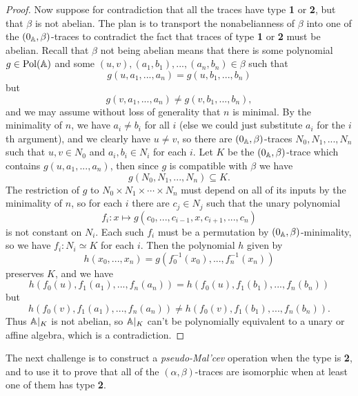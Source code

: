 \begin{appendices}
\begin{proof}
Now suppose for contradiction that all the traces have type \textbf{1} or \textbf{2}, but that $\beta$ is not abelian. The plan is to transport the nonabelianness of $\beta$ into one of the $(0_{\mathbb{A}},\beta)$-traces to contradict the fact that traces of type \textbf{1} or \textbf{2} must be abelian. Recall that $\beta$ not being abelian means that there is some polynomial $g \in \operatorname{Pol}(\mathbb{A})$ and some $(u,v), (a_1,b_1), ..., (a_n,b_n) \in \beta$ such that
\[
g(u,a_1,...,a_n) = g(u,b_1,...,b_n)
\]
but
\[
g(v,a_1,...,a_n) \ne g(v,b_1,...,b_n),
\]
and we may assume without loss of generality that $n$ is minimal. By the minimality of $n$, we have $a_i \ne b_i$ for all $i$ (else we could just substitute $a_i$ for the $i$th argument), and we clearly have $u \ne v$, so there are $(0_{\mathbb{A}},\beta)$-traces $N_0, N_1, ..., N_n$ such that $u,v \in N_0$ and $a_i,b_i \in N_i$ for each $i$. Let $K$ be the $(0_{\mathbb{A}},\beta)$-trace which contains $g(u,a_1,...,a_n)$, then since $g$ is compatible with $\beta$ we have
\[
g(N_0,N_1, ..., N_n) \subseteq K.
\]
The restriction of $g$ to $N_0\times N_1 \times \cdots \times N_n$ must depend on all of its inputs by the minimality of $n$, so for each $i$ there are $c_j \in N_j$ such that the unary polynomial
\[
f_i : x \mapsto g(c_0,...,c_{i-1},x,c_{i+1},...,c_n)
\]
is not constant on $N_i$. Each such $f_i$ must be a permutation by $(0_{\mathbb{A}},\beta)$-minimality, so we have $f_i : N_i \simeq K$ for each $i$. Then the polynomial $h$ given by
\[
h(x_0,...,x_n) = g(f_0^{-1}(x_0), ..., f_n^{-1}(x_n))
\]
preserves $K$, and we have
\[
h(f_0(u), f_1(a_1), ..., f_n(a_n)) = h(f_0(u), f_1(b_1), ..., f_n(b_n))
\]
but
\[
h(f_0(v), f_1(a_1), ..., f_n(a_n)) \ne h(f_0(v), f_1(b_1), ..., f_n(b_n)).
\]
Thus $\mathbb{A}|_K$ is not abelian, so $\mathbb{A}|_K$ can't be polynomially equivalent to a unary or affine algebra, which is a contradiction.
\end{proof}

The next challenge is to construct a \emph{pseudo-Mal'cev} operation when the type is \textbf{2}, and to use it to prove that all of the $(\alpha,\beta)$-traces are isomorphic when at least one of them has type \textbf{2}.


\end{appendices}
